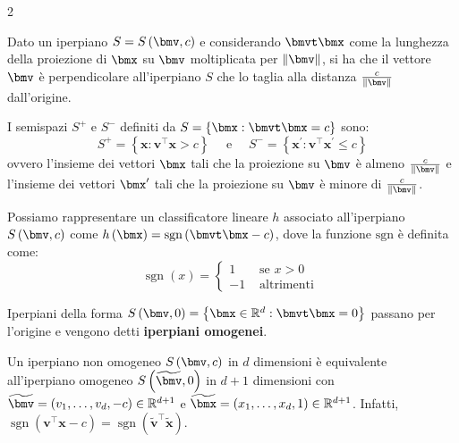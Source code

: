 \documentclass[\main/main.tex]{subfiles}
\begin{document}
\begin{multicols}{2}
\begin{property}
    Dato un iperpiano \(S=S\rnd{\bmv, c}\) e considerando \(\bmvt\bmx\) come la lunghezza della proiezione di \(\bmx\) su \(\bmv\) moltiplicata per \(\norm{\bmv}\), si ha che il vettore \(\bmv\) è perpendicolare all'iperpiano \(S\) che lo taglia alla distanza \(\frac{c}{\norm{\bmv}}\) dall'origine.
\end{property}
\begin{definition}[Semispazi \(S^+\) ed \(S^-\)]
    I semispazi \(S^+\) e \(S^-\) definiti da \(S = \crl{\bmx: \bmvt\bmx = c}\) sono:
    \[
        S^{+}=\left\{\boldsymbol{x} : \boldsymbol{v}^{\top} \boldsymbol{x}>c\right\} \quad \text { e } \quad S^{-}=\left\{\boldsymbol{x}^{\prime} : \boldsymbol{v}^{\top} \boldsymbol{x}^{\prime} \leq c\right\}
    \]
    ovvero l'insieme dei vettori \(\bmx\) tali che la proiezione su \(\bmv\) è almeno \(\frac{c}{\norm{\bmv}}\) e l'insieme dei vettori \(\bmx'\) tali che la proiezione su \(\bmv\) è minore di \(\frac{c}{\norm{\bmv}}\).
\end{definition}
\begin{definition}
    Possiamo rappresentare un classificatore lineare \(h\) associato all'iperpiano \(S\rnd{\bmv, c}\) come \(h\rnd{\bmx} = \text{sgn}\rnd{\bmvt\bmx - c}\), dove la funzione \(\text{sgn}\) è definita come:
    \[
        \operatorname{sgn}(x)=\left\{\begin{array}{cc}{1} & {\text { se } x>0} \\ {-1} & {\text { altrimenti }}\end{array}\right.
    \]
\end{definition}
\begin{definition}
    Iperpiani della forma \(S\rnd{\bmv, 0} = \crl{\bmx \in \R^d: \bmvt\bmx = 0}\) passano per l'origine e vengono detti \textbf{iperpiani omogenei}.
\end{definition}
\begin{definition}
    Un iperpiano non omogeneo \(S\rnd{\bmv, c}\) in \(d\) dimensioni è equivalente all'iperpiano omogeneo \(S\rnd{\tilde{\bmv}, 0}\) in \(d+1\) dimensioni con \(\tilde{\bmv} = \rnd{v_1, \ldots, v_d, -c} \in \R^{d+1}\) e \(\tilde{\bmx} = \rnd{x_1, \ldots, x_d, 1} \in \R^{d+1}\). Infatti, \(\operatorname{sgn}\left(\boldsymbol{v}^{\top} \boldsymbol{x}-c\right)=\operatorname{sgn}\left(\widetilde{\boldsymbol{v}}^{\top} \widetilde{\boldsymbol{x}}\right)\).
\end{definition}
\begin{definition}

\end{definition}
\end{multicols}
\end{document}
